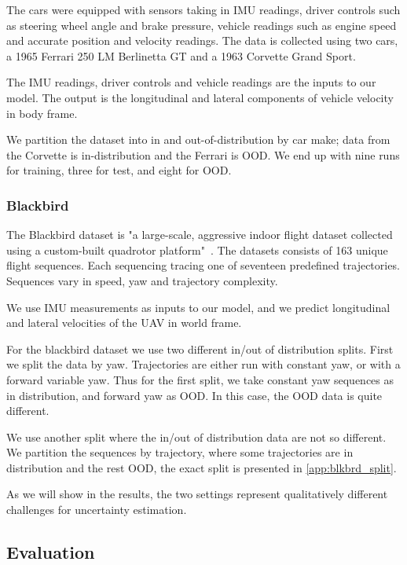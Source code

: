\documentclass[../main.tex]{subfiles}
\begin{document}
The cars were equipped with sensors taking in IMU readings, driver controls such as steering wheel angle and brake pressure, vehicle readings such as engine speed and accurate position and velocity readings. The data is collected using two cars, a 1965 Ferrari 250 LM Berlinetta GT and a 1963 Corvette Grand Sport. 

The IMU readings, driver controls and vehicle readings are the inputs to our model. The output is the longitudinal and lateral components of vehicle velocity in body frame. 

We partition the dataset into in and out-of-distribution by car make; data from the Corvette is in-distribution and the Ferrari is OOD. We end up with nine runs for training, three for test, and eight for OOD. 

\subsubsection{Blackbird}

The Blackbird dataset is "a large-scale, aggressive indoor flight dataset collected using a custom-built quadrotor platform"~\citep{antonini2018blackbird}. The datasets consists of 163 unique flight sequences. Each sequencing tracing one of seventeen predefined trajectories. Sequences vary in speed, yaw and trajectory complexity. 

We use IMU measurements as inputs to our model, and we predict longitudinal and lateral velocities of the UAV in world frame. 

For the blackbird dataset we use two different in/out of distribution splits. First we split the data by yaw. Trajectories are either run with constant yaw, or with a forward variable yaw.
Thus for the first split, we take constant yaw sequences as in distribution, and forward yaw as OOD. In this case, the OOD data is quite different.

We use another split where the in/out of distribution data are not so different. We partition the sequences by trajectory, where some trajectories are in distribution and the rest OOD, the exact split is presented in \cref{app:blkbrd_split}. 

As we will show in the results, the two settings represent qualitatively different challenges for uncertainty estimation. 

\subsection{Evaluation}
\end{document}
